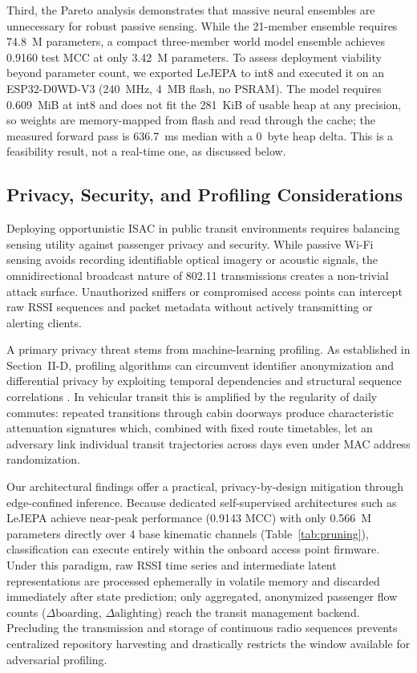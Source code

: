 Third, the Pareto analysis demonstrates that massive neural ensembles are unnecessary for robust passive sensing. While the 21-member ensemble requires 74.8~M parameters, a compact three-member world model ensemble achieves 0.9160 test \ac{MCC} at only 3.42~M parameters. To assess deployment viability beyond parameter count, we exported LeJEPA to int8 and executed it on an ESP32-D0WD-V3 (240~MHz, 4~MB flash, no PSRAM). The model requires 0.609~MiB at int8 and does not fit the 281~KiB of usable heap at any precision, so weights are memory-mapped from flash and read through the cache; the measured forward pass is 636.7~ms median with a 0~byte heap delta. This is a feasibility result, not a real-time one, as discussed below.

\subsection{Privacy, Security, and Profiling Considerations}

Deploying opportunistic ISAC in public transit environments requires balancing sensing utility against passenger privacy and security. While passive Wi-Fi sensing avoids recording identifiable optical imagery or acoustic signals, the omnidirectional broadcast nature of 802.11 transmissions creates a non-trivial attack surface. Unauthorized sniffers or compromised access points can intercept raw \ac{RSSI} sequences and packet metadata without actively transmitting or alerting clients.

A primary privacy threat stems from machine-learning profiling. As established in Section~II-D, profiling algorithms can circumvent identifier anonymization and differential privacy by exploiting temporal dependencies and structural sequence correlations \cite{silva2025iknow,silva2025evaluatingdp}. In vehicular transit this is amplified by the regularity of daily commutes: repeated transitions through cabin doorways produce characteristic attenuation signatures which, combined with fixed route timetables, let an adversary link individual transit trajectories across days even under MAC address randomization.

Our architectural findings offer a practical, privacy-by-design mitigation through edge-confined inference. Because dedicated self-supervised architectures such as LeJEPA achieve near-peak performance (0.9143 \ac{MCC}) with only 0.566~M parameters directly over 4 base kinematic channels (Table~\ref{tab:pruning}), classification can execute entirely within the onboard access point firmware. Under this paradigm, raw \ac{RSSI} time series and intermediate latent representations are processed ephemerally in volatile memory and discarded immediately after state prediction; only aggregated, anonymized passenger flow counts ($\Delta \text{boarding}$, $\Delta \text{alighting}$) reach the transit management backend. Precluding the transmission and storage of continuous radio sequences prevents centralized repository harvesting and drastically restricts the window available for adversarial profiling.

